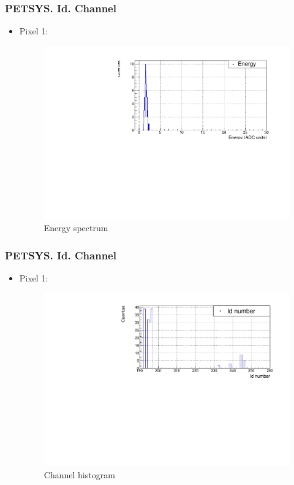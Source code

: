 \documentclass{beamer}
\begin{document}
\begin{frame}
\frametitle{PETSYS. Id. Channel}
\begin{itemize}
\item{} Pixel 1:

\begin{figure}[hbtp]
\centering
\includegraphics[scale=0.5]{PETSYS/Id_channel/energy_spectrum_pixel_1.pdf}
\caption{Energy spectrum}
\end{figure}

\end{itemize}

\end{frame}

\begin{frame}
\frametitle{PETSYS. Id. Channel}
\begin{itemize}
\item{} Pixel 1:

\begin{figure}[hbtp]
\centering
\includegraphics[scale=0.6]{PETSYS/Id_channel/Channel_pixel_1.pdf}
\caption{Channel histogram}
\end{figure}

\end{itemize}

\end{frame}
\end{document}
